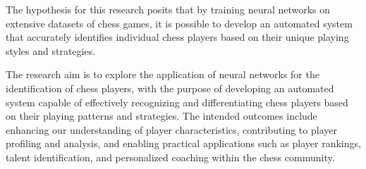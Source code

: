 \begin{spacing}{2.0}
The hypothesis for this research posits that by training neural networks on extensive datasets of chess games, it is possible to develop an automated system that accurately identifies individual chess players based on their unique playing styles and strategies.

The research aim is to explore the application of neural networks for the identification of chess players, with the purpose of developing an automated system capable of effectively recognizing and differentiating chess players based on their playing patterns and strategies. The intended outcomes include enhancing our understanding of player characteristics, contributing to player profiling and analysis, and enabling practical applications such as player rankings, talent identification, and personalized coaching within the chess community.


\end{spacing}
\newpage


